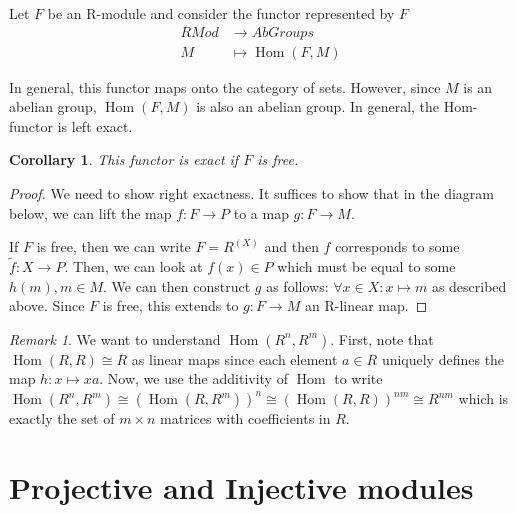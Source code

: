 \documentclass{article}
\DeclareMathOperator{\Hom}{Hom}
\newtheorem{corollary}{Corollary}[theorem]
\theoremstyle{definition}
\theoremstyle{remark}
\newtheorem*{remark}{Remark}
\theoremstyle{plain}
\begin{document}
Let \(F\) be an R-module and consider the functor represented by \(F\)
\begin{align*}
    RMod &\to AbGroups \\
    M &\mapsto \Hom(F,M)
\end{align*}

In general, this functor maps onto the category of sets. However, since \(M\) is an abelian group, 
\(\Hom(F,M)\) is also an abelian group. In general, the Hom-functor is left exact. 

\begin{corollary}
    This functor is exact if \(F\) is free. 
\end{corollary}
\begin{proof}
    We need to show right exactness. It suffices to show that in the diagram below, we can lift the map \(f:F \to P\)
    to a map \(g:F \to M\).

    \begin{figure}[h]
    \centering
\end{figure}

    If \(F\) is free, then we can write \(F = R^{(X)}\) and then \(f\) corresponds to some \(\tilde{f}: X \to P\). Then, 
    we can look at \(f(x) \in P\) which must be equal to some \(h(m), m \in M\). We can then construct \(g\) as follows: 
    \(\forall x \in X: x \mapsto m\) as described above. Since \(F\) is free, this extends to \(g: F \to M\) an R-linear map.
\end{proof}

\begin{remark}
    We want to understand \(\Hom(R^n, R^m)\). First, note that \(\Hom(R,R) \cong R\) as linear maps since each element \(a \in R\) uniquely 
    defines the map \(h: x \mapsto xa\). Now, we use the additivity of \(\Hom\) to write \(\Hom(R^n, R^m) \cong (\Hom(R, R^m))^n \cong
    (\Hom(R,R))^{nm} \cong R^{nm}\) which is exactly the set of \(m\times n\) matrices with coefficients in \(R\).
\end{remark}

\section{Projective and Injective modules}
\end{document}
